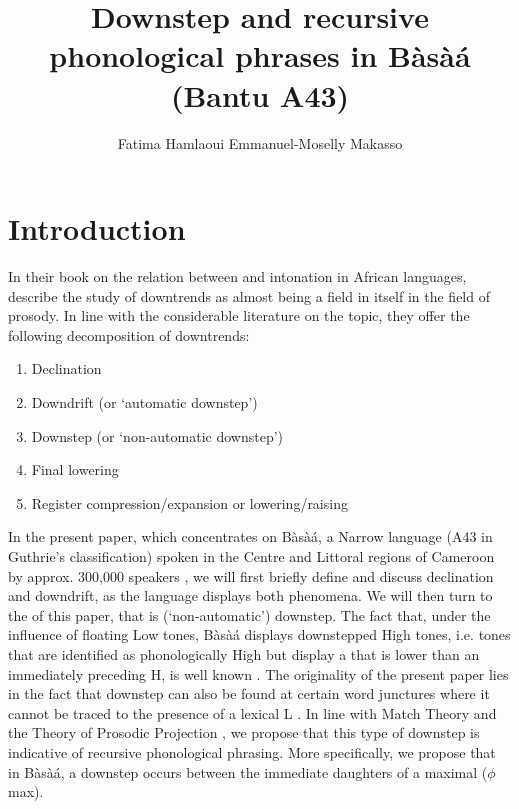 \documentclass[output=paper,newtxmath,modfonts,nonflat,hidelinks]{langsci/langscibook}
\title{Downstep and recursive phonological phrases in Bàsà{á} (Bantu A43)}
\author{Fatima Hamlaoui\affiliation{ZAS, Berlin; University of Toronto} \lastand Emmanuel-Moselly Makasso\affiliation{ZAS, Berlin}}
\begin{document}
\maketitle


\section{Introduction}\label{sec:HamlaouiMakasso:1} 

In their book on the relation between  and intonation in African languages, \citet{DowningRialland16} describe the study of downtrends as almost being a field in itself in the field of prosody. In line with the considerable literature on the topic, they offer the following decomposition of downtrends:

\begin{enumerate}
\item Declination
\item Downdrift (or `automatic downstep')
\item Downstep (or `non-automatic downstep')
\item Final lowering
\item Register compression/expansion or  lowering/raising
\end{enumerate}

\noindent In the present paper, which concentrates on Bàsà{á}, a Narrow  language (A43 in Guthrie's classification) spoken in the Centre and Littoral regions of Cameroon by approx. 300,000 speakers \citep{SIL}, we will first briefly define and discuss declination and downdrift, as the language displays both phenomena. We will then turn to the  of this paper, that is (`non-automatic') downstep. The fact that,  under the influence of floating Low tones,  Bàsà{á} displays downstepped High tones, i.e. tones that are identified as phonologically High but display a  that is lower than an immediately preceding H, is well known \citep[a.o.][]{Dimmendaal88,Kody93,Hyman03,HamlaouiEtAl14}. The originality of the present paper lies in the fact that downstep can also be found at certain word junctures where it cannot be traced to the presence of a lexical L . In line with Match Theory \citep{Selkirk09, Selkirk11} and the Theory of Prosodic Projection \citep[a.o.][]{ItoMester12}, we propose that this type of downstep is indicative of recursive phonological phrasing. More specifically, we propose that in Bàsà{á}, a downstep occurs between the immediate daughters of a maximal  ($\phi$max).
\nocite{Guthrie48}
\end{document}

